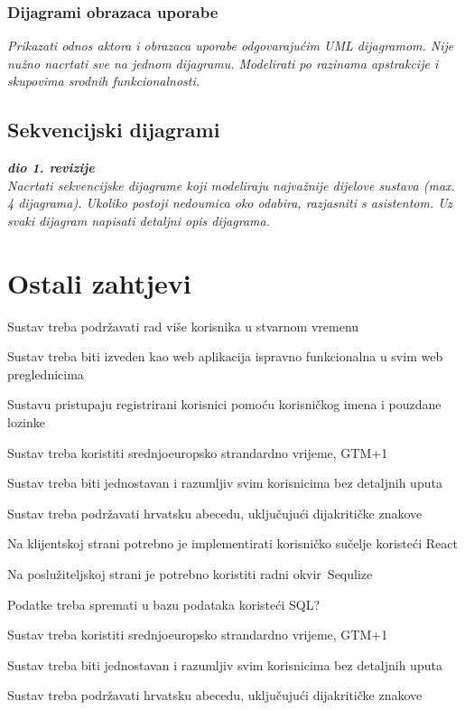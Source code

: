 					
				\subsubsection{Dijagrami obrazaca uporabe}
					
					\textit{Prikazati odnos aktora i obrazaca uporabe odgovarajućim UML dijagramom. Nije nužno nacrtati sve na jednom dijagramu. Modelirati po razinama apstrakcije i skupovima srodnih funkcionalnosti.}
				\eject		
				
			\subsection{Sekvencijski dijagrami}
				
				\textbf{\textit{dio 1. revizije}}\\
				
				\textit{Nacrtati sekvencijske dijagrame koji modeliraju najvažnije dijelove sustava (max. 4 dijagrama). Ukoliko postoji nedoumica oko odabira, razjasniti s asistentom. Uz svaki dijagram napisati detaljni opis dijagrama.}
				\eject
	
		\section{Ostali zahtjevi}
		
			\begin{packed_item}

				\item Sustav treba podržavati rad više korisnika u stvarnom vremenu
				\item Sustav treba biti izveden kao web aplikacija ispravno funkcionalna u svim web preglednicima
				\item	 Sustavu pristupaju registrirani korisnici pomoću korisničkog imena i pouzdane lozinke
				\item Sustav treba koristiti srednjoeuropsko strandardno vrijeme, GTM+1
				\item Sustav treba biti jednostavan i razumljiv svim korisnicima bez detaljnih uputa
				\item Sustav treba podržavati hrvatsku abecedu, uključujući dijakritičke znakove
				\item Na klijentskoj strani potrebno je implementirati korisničko sučelje koristeći React
				\item Na poslužiteljskoj strani je potrebno koristiti radni okvir Sequlize
				\item Podatke treba spremati u bazu podataka koristeći SQL?
				\item Sustav treba koristiti srednjoeuropsko strandardno vrijeme, GTM+1
				\item Sustav treba biti jednostavan i razumljiv svim korisnicima bez detaljnih uputa
				\item Sustav treba podržavati hrvatsku abecedu, uključujući dijakritičke znakove
			\end{packed_item}

			 
			 
	